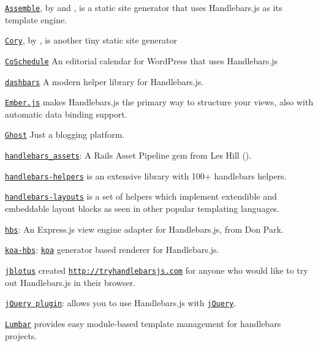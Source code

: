 \begin{DoxyItemize}
\item \href{http://assemble.io}{\tt Assemble}, by \href{https://github.com/jonschlinkert}{\tt } and \href{https://github.com/doowb}{\tt }, is a static site generator that uses Handlebars.\+js as its template engine.
\item \href{https://github.com/leo/cory}{\tt Cory}, by \href{https://github.com/leo}{\tt }, is another tiny static site generator
\item \href{http://coschedule.com}{\tt Co\+Schedule} An editorial calendar for Word\+Press that uses Handlebars.\+js
\item \href{https://github.com/pismute/dashbars}{\tt dashbars} A modern helper library for Handlebars.\+js.
\item \href{http://www.emberjs.com}{\tt Ember.\+js} makes Handlebars.\+js the primary way to structure your views, also with automatic data binding support.
\item \href{https://ghost.org/}{\tt Ghost} Just a blogging platform.
\item \href{http://github.com/leshill/handlebars_assets}{\tt handlebars\+\_\+assets}\+: A Rails Asset Pipeline gem from Les Hill ().
\item \href{https://github.com/assemble/handlebars-helpers}{\tt handlebars-\/helpers} is an extensive library with 100+ handlebars helpers.
\item \href{https://github.com/shannonmoeller/handlebars-layouts}{\tt handlebars-\/layouts} is a set of helpers which implement extendible and embeddable layout blocks as seen in other popular templating languages.
\item \href{http://github.com/donpark/hbs}{\tt hbs}\+: An Express.\+js view engine adapter for Handlebars.\+js, from Don Park.
\item \href{https://github.com/jwilm/koa-hbs}{\tt koa-\/hbs}\+: \href{https://github.com/koajs/koa}{\tt koa} generator based renderer for Handlebars.\+js.
\item \href{http://github.com/jblotus}{\tt jblotus} created \href{http://tryhandlebarsjs.com}{\tt http\+://tryhandlebarsjs.\+com} for anyone who would like to try out Handlebars.\+js in their browser.
\item \href{http://71104.github.io/jquery-handlebars/}{\tt j\+Query plugin}\+: allows you to use Handlebars.\+js with \href{http://jquery.com/}{\tt j\+Query}.
\item \href{http://walmartlabs.github.io/lumbar}{\tt Lumbar} provides easy module-\/based template management for handlebars projects.

\end{DoxyItemize}
